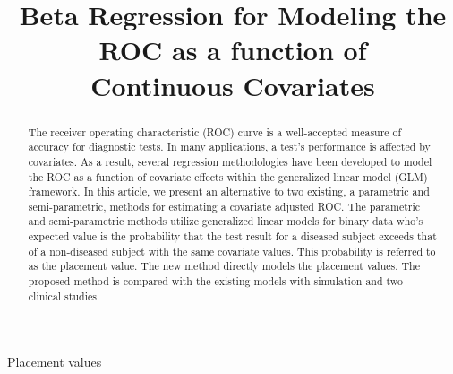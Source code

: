 \documentclass{interact}
\theoremstyle{definition}
\begin{document}
     \title{Beta Regression for Modeling the ROC as a function of\\ Continuous Covariates}
\author{
}


\maketitle

\begin{abstract} 
      The receiver operating characteristic (ROC) curve is a well-accepted measure of accuracy for diagnostic tests.  In many applications, a test's performance is affected by covariates. As a result,
several regression methodologies have been developed to model the ROC as a function of covariate effects within the generalized linear model (GLM) framework.   In this article, we present an alternative  to two existing,  a parametric and semi-parametric, methods for estimating a covariate adjusted ROC. 
The parametric and semi-parametric methods utilize generalized linear models for binary data who's expected value is
the probability that the test result for a diseased subject exceeds that of a non-diseased subject with the same covariate values.   This probability is referred to as the placement value.
The new method directly models the placement values. 
The proposed method is compared with the existing models with simulation and two clinical studies.
     \end{abstract}


\begin{keywords}
Placement values
\end{keywords}
\end{document}
